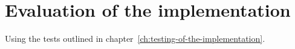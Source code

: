 \chapter{Evaluation of the implementation}\label{ch:evaluation-of-the-implementation}
Using the tests outlined in chapter~\ref{ch:testing-of-the-implementation}.